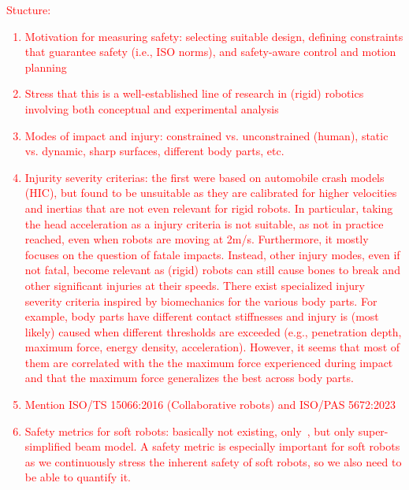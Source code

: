 \textcolor{red}{Stucture: \begin{enumerate}
    \item Motivation for measuring safety: selecting suitable design, defining constraints that guarantee safety (i.e., ISO norms), and safety-aware control and motion planning
    \item Stress that this is a well-established line of research in (rigid) robotics involving both conceptual and experimental analysis
    \item Modes of impact and injury: constrained vs. unconstrained (human), static vs. dynamic, sharp surfaces, different body parts, etc.~\citep{haddadin2009requirements}
    \item Injurity severity criterias: the first were based on automobile crash models (HIC), but found to be unsuitable as they are calibrated for higher velocities and inertias that are not even relevant for rigid robots. In particular, taking the head acceleration as a injury criteria is not suitable, as not in practice reached, even when robots are moving at 2m/s. Furthermore, it mostly focuses on the question of fatale impacts. Instead, other injury modes, even if not fatal, become relevant as (rigid) robots can still cause bones to break and other significant injuries at their speeds. There exist specialized injury severity criteria inspired by biomechanics for the various body parts. For example, body parts have different contact stiffnesses and injury is (most likely) caused when different thresholds are exceeded (e.g., penetration depth, maximum force, energy density, acceleration). However, it seems that most of them are correlated with the the maximum force experienced during impact and that the maximum force generalizes the best across body parts.
    \item Mention ISO/TS 15066:2016 (Collaborative robots) and ISO/PAS 5672:2023
    \item Safety metrics for soft robots: basically not existing, only~\citep{abidi2017intrinsic}, but only super-simplified beam model. A safety metric is especially important for soft robots as we continuously stress the inherent safety of soft robots, so we also need to be able to quantify it.
\end{enumerate}}

